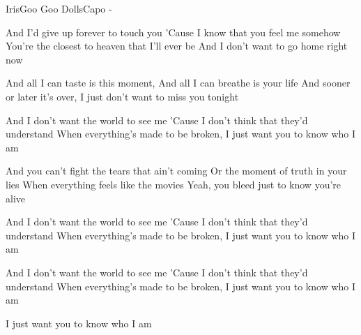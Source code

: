 \begin{song}{Iris}{Goo Goo Dolls}{Capo -}


And I'd give up forever to touch you
'Cause I know that you feel me somehow
You're the closest to heaven that I'll ever be
And I don't want to go home right now

And all I can taste is this moment, And all I can breathe is your life
And sooner or later it's over, I just don't want to miss you tonight

And I don't want the world to see me
'Cause I don't think that they'd understand
When everything's made to be broken, I just want you to know who I am


And you can't fight the tears that ain't coming
Or the moment of truth in your lies
When everything feels like the movies
Yeah, you bleed just to know you're alive

And I don't want the world to see me
'Cause I don't think that they'd understand
When everything's made to be broken, I just want you to know who I am


And I don't want the world to see me
'Cause I don't think that they'd understand
When everything's made to be broken, I just want you to know who I am

I just want you to know who I am
\end{song}
